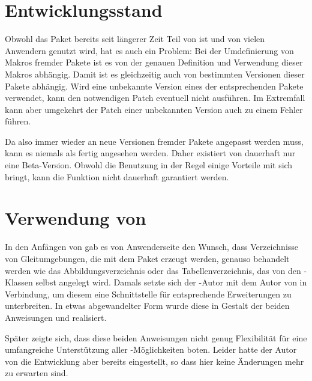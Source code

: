\section{Entwicklungsstand}

Obwohl das Paket bereits seit längerer Zeit Teil von \KOMAScript{} ist und
von vielen Anwendern genutzt wird, hat es auch ein Problem: Bei
der Umdefinierung von Makros fremder Pakete ist es von der genauen Definition
und Verwendung dieser Makros abhängig. Damit ist es gleichzeitig auch von
bestimmten Versionen dieser Pakete abhängig. Wird eine unbekannte Version
eines der entsprechenden Pakete verwendet, kann  den
notwendigen Patch eventuell nicht ausführen. Im Extremfall kann aber umgekehrt
der Patch einer unbekannten Version auch zu einem Fehler führen.

Da also  immer wieder an neue Versionen fremder Pakete
angepasst werden muss, kann es niemals als fertig angesehen werden. Daher
existiert von  dauerhaft nur eine Beta-Version. Obwohl die
Benutzung in der Regel einige Vorteile mit sich bringt, kann die Funktion
nicht dauerhaft garantiert werden.


\section{Verwendung von }

In den Anfängen von \KOMAScript{} gab es von Anwenderseite den Wunsch, dass
Verzeichnisse von Gleitumgebungen, die mit dem Paket
 erzeugt werden,
genauso behandelt werden wie das Abbildungsverzeichnis oder das
Tabellenverzeichnis, das von den \KOMAScript-Klassen selbst angelegt
wird. Damals setzte sich der \KOMAScript-Autor mit dem Autor von
 in Verbindung, um diesem eine Schnittstelle für entsprechende
Erweiterungen zu unterbreiten. In etwas abgewandelter Form wurde diese in
Gestalt der beiden Anweisungen
 und
 realisiert.

Später zeigte sich, dass diese beiden Anweisungen nicht genug Flexibilität für
eine umfangreiche Unterstützung aller \KOMAScript-Möglichkeiten boten. Leider
hatte der Autor von  die Entwicklung aber bereits eingestellt,
so dass hier keine Änderungen mehr zu erwarten sind.


